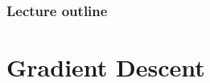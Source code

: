 









\begin{frame}
\frametitle{Lecture outline}
\tableofcontents
\end{frame}


\section{Gradient Descent}

